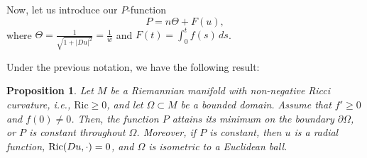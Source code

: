 \documentclass[12pt]{amsart}
\theoremstyle{plain}
\newtheorem{proposition}{\bf Proposition}
\numberwithin{equation}{section}
\begin{document}
Now, let us introduce our $P$-function 
$$P=n\Theta+ F(u),$$
where $\Theta=\frac{1}{\sqrt{1+|D u|^2}}=\frac{1}{w}$ and $F(t)=\int_0^t f(s)\, ds$.

Under the previous notation, we have the following result:

\begin{proposition}\label{pfunction1}
Let \( M \) be a Riemannian manifold with non-negative Ricci curvature, i.e., \( \mathrm{Ric} \geq 0 \), and let \( \Omega \subset M \) be a bounded domain. Assume that \( f' \geq 0 \) and \( f(0) \neq 0 \). Then, the function \( P \) attains its minimum on the boundary \( \partial \Omega \), or \( P \) is constant throughout \( \Omega \). Moreover, if \( P \) is constant, then $u$ is a radial function, ${\rm Ric}(Du,\cdot)=0$, and \( \Omega \) is isometric to a Euclidean ball.
\end{proposition}
\end{document}
